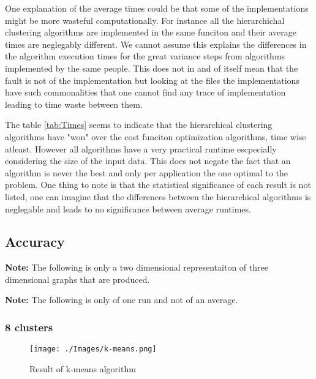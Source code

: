 \documentclass[12pt, a4paper]{article}
\begin{document}
One explanation of the average times could be that some of the implementations might be more wasteful computationally. For instance all the hierarchichal clustering algorithms are implemented in the same funciton and their average times are neglegably different. We cannot assume this explains the differences in the algorithm execution times for the great variance steps from algorithms implemented by the same people. This does not in and of itself mean that the fault is not of the implementation but looking at the files the implementations have such commonalities that one cannot find any trace of implementation leading to time waste between them.
\newline

The table \ref{tab:Times} seems to indicate that the hierarchical clustering algorithms have "won" over the cost funciton optimization algorithms, time wise atleast. However all algorithms have a very practical runtime escpecially considering the size of the input data. This does not negate the fact that an algorithm is never the best and only per application the one optimal to the problem. One thing to note is that the statistical significance of each result is not listed, one can imagine that the differences between the hierarchical algorithms is neglegable and leads to no significance between average runtimes.
\newline

\subsection{Accuracy}

\textbf{Note: } The following is only a two dimensional representaiton of three dimensional graphs that are produced.
\newline

\textbf{Note: } The following is only of one run and not of an average.
\newline

\subsubsection{8 clusters}

\begin{figure}[H]
    \begin{center}
        \texttt{[image: ./Images/k-means.png]}
    \end{center}
    \caption{Result of k-means algorithm}\label{fig:means}
\end{figure}
\end{document}
